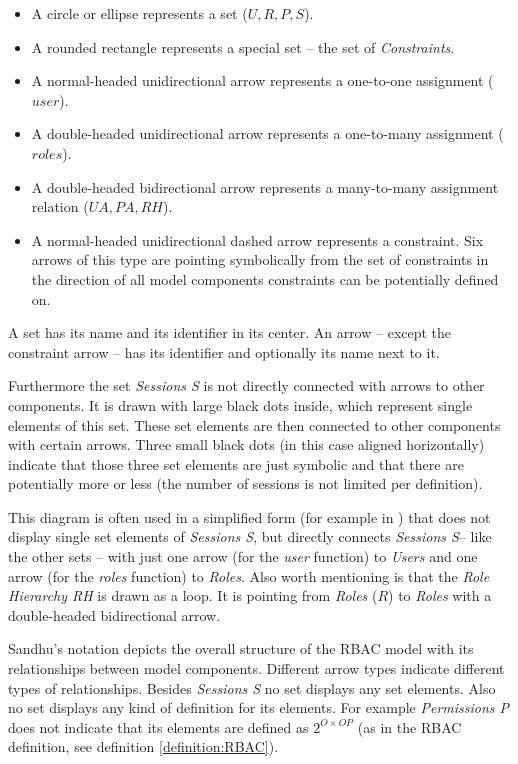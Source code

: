 \documentclass[twoside, openright, 12pt]{book}
\begin{document}
\begin{itemize}
\item A circle or ellipse represents a set ($U, R, P, S$).
\item A rounded rectangle represents a special set -- the set of \textit{Constraints}.
\item A normal-headed unidirectional arrow represents a one-to-one assignment ($user$).
\item A double-headed unidirectional arrow represents a one-to-many assignment ($roles$).
\item A double-headed bidirectional arrow represents a many-to-many assignment relation ($UA, PA, RH$).
\item A normal-headed unidirectional dashed arrow represents a constraint.
Six arrows of this type are pointing symbolically from the set of constraints in the direction of all model components constraints can be potentially defined on.
\end{itemize}

\noindent
A set has its name and its identifier in its center.
An arrow -- except the constraint arrow -- has its identifier and optionally its name next to it.

Furthermore the set \textit{Sessions S} is not directly connected with arrows to other components.
It is drawn with large black dots inside, which represent single elements of this set.
These set elements are then connected to other components with certain arrows.
Three small black dots (in this case aligned horizontally) indicate that those three set elements are just symbolic and that there are potentially more or less (the number of sessions is not limited per definition).

This diagram is often used in a simplified form (for example in \citep{Amthor18}) that does not display single set elements of \textit{Sessions S}, but directly connects \textit{Sessions S}-- like the other sets -- with just one arrow (for the \textit{user} function) to \textit{Users} and one arrow (for the \textit{roles} function) to \textit{Roles}.
Also worth mentioning is that the \textit{Role Hierarchy RH} is drawn as a loop. 
It is pointing from \textit{Roles} ($R$) to \textit{Roles} with a double-headed bidirectional arrow.

Sandhu's notation depicts the overall structure of the RBAC model with its relationships between model components.
Different arrow types indicate different types of relationships.
Besides \textit{Sessions S} no set displays any set elements.
Also no set displays any kind of definition for its elements.
For example \textit{Permissions P} does not indicate that its elements are defined as $2^{O \times OP}$ (as in the RBAC definition, see definition \ref{definition:RBAC}).
\end{document}
